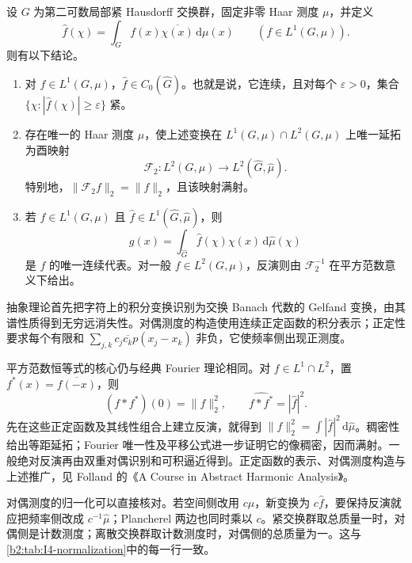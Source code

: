 \begin{claim}
\label{b2:claim:I5-plancherel}
设 \(G\) 为第二可数局部紧 Hausdorff 交换群，固定非零 Haar 测度 \(\mu\)，并定义
\[
 \widehat f(\chi)=\int_Gf(x)\overline{\chi(x)}\,\mathrm d\mu(x)
 \qquad(f\in L^1(G,\mu)).
\]
则有以下结论。
\begin{enumerate}
\item\label{b2:item:I5-riemann-lebesgue}
对 \(f\in L^1(G,\mu)\)，\(\widehat f\in C_0(\widehat G)\)。也就是说，它连续，且对每个 \(\varepsilon>0\)，集合 \(\{\chi:|\widehat f(\chi)|\ge\varepsilon\}\) 紧。
\item\label{b2:item:I5-plancherel-measure}
存在唯一的 Haar 测度 \(\widehat\mu\)，使上述变换在 \(L^1(G,\mu)\cap L^2(G,\mu)\) 上唯一延拓为酉映射
\[
 \mathcal F_2:L^2(G,\mu)\longrightarrow L^2(\widehat G,\widehat\mu).
\]
特别地，\(\|\mathcal F_2f\|_2=\|f\|_2\)，且该映射满射。
\item\label{b2:item:I5-inversion}
若 \(f\in L^1(G,\mu)\) 且 \(\widehat f\in L^1(\widehat G,\widehat\mu)\)，则
\[
 g(x)=\int_{\widehat G}\widehat f(\chi)\chi(x)\,\mathrm d\widehat\mu(\chi)
\]
是 \(f\) 的唯一连续代表。对一般 \(f\in L^2(G,\mu)\)，反演则由 \(\mathcal F_2^{-1}\) 在平方范数意义下给出。
\end{enumerate}
\end{claim}
\begin{proofsketch}
抽象理论首先把字符上的积分变换识别为交换 Banach 代数的 Gelfand 变换，由其谱性质得到无穷远消失性。对偶测度的构造使用连续正定函数的积分表示；正定性要求每个有限和
\(\sum_{j,k}c_j\overline{c_k}p(x_j-x_k)\) 非负，它使频率侧出现正测度。

平方范数恒等式的核心仍与经典 Fourier 理论相同。对 \(f\in L^1\cap L^2\)，置 \(f^*(x)=\overline{f(-x)}\)，则
\[
 (f*f^*)(0)=\|f\|_2^2,\qquad
 \widehat{f*f^*}=|\widehat f|^2.
\]
先在这些正定函数及其线性组合上建立反演，就得到
\(\|f\|_2^2=\int|\widehat f|^2\,\mathrm d\widehat\mu\)。稠密性给出等距延拓；Fourier 唯一性及平移公式进一步证明它的像稠密，因而满射。一般绝对反演再由双重对偶识别和可积逼近得到。正定函数的表示、对偶测度构造与上述推广，见 Folland 的《A Course in Abstract Harmonic Analysis》\cite[Sections 4.2 and 4.3]{Folland2016Abstract}。
\end{proofsketch}

对偶测度的归一化可以直接核对。若空间侧改用 \(c\mu\)，新变换为 \(c\widehat f\)，要保持反演就应把频率侧改成 \(c^{-1}\widehat\mu\)；Plancherel 两边也同时乘以 \(c\)。紧交换群取总质量一时，对偶侧是计数测度；离散交换群取计数测度时，对偶侧的总质量为一。这与\cref{b2:tab:I4-normalization}中的每一行一致。

